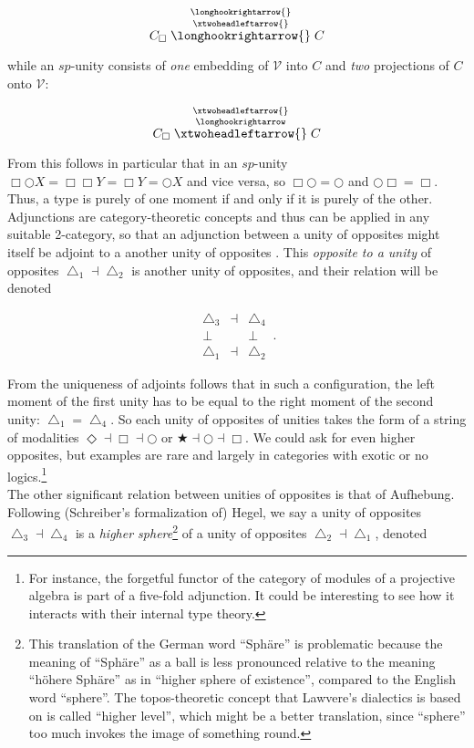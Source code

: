 \documentclass{article}
\begin{document}
$$C_\Box\stackrel{\longhookrightarrow{}}{\stackrel{\xtwoheadleftarrow{}}{\longhookrightarrow{}}}C$$

while an $sp$-unity consists of \emph{one} embedding of $\mathcal{V}$ into $C$ and \emph{two} projections
of $C$ onto $\mathcal{V}$:

$$C_\Box\stackrel{\xtwoheadleftarrow{}}{\stackrel{\longhookrightarrow}{\xtwoheadleftarrow{}}}C$$

From this follows in particular that in an $sp$-unity $\Box\bigcirc X=\Box\Box Y=\Box Y= \bigcirc X$ and
vice versa, so $\Box\bigcirc=\bigcirc$ and $\bigcirc\Box=\Box$. Thus, a type is purely of one moment if
and only if it is purely of the other. \\

Adjunctions are category-theoretic concepts and thus can be applied in any suitable 2-category, so that
an adjunction between a unity of opposites might itself be adjoint to a another unity of opposites \cite{Shu}.
This \emph{opposite to a unity} of opposites $\bigtriangleup_1\dashv\bigtriangleup_2$ is another unity of
opposites, and their relation will be denoted 


$$
  \begin{array}{ccc}
    \bigtriangleup_3 &\dashv& \bigtriangleup_4
    \\
    \bot & & \bot
    \\
    \bigtriangleup_1 &\dashv& \bigtriangleup_2
    \end{array}
  \,.
$$

From the uniqueness of adjoints follows that in such a configuration, the left moment of the first unity
has to be equal to the right moment of the second unity: $\bigtriangleup_1=\bigtriangleup_4$. So each
unity of opposites of unities takes the form of a string of modalities $\Diamond\dashv\Box\dashv\bigcirc$
or $\bigstar\dashv\bigcirc\dashv\Box$. We could ask for even higher opposites, but examples are rare and
largely in categories with exotic or no logics.\footnote{For instance, the forgetful functor of the category
of modules of a projective algebra is part of a five-fold adjunction. It could be interesting to see how
it interacts with their internal type theory.} \\

The other significant relation between unities of opposites is that of Aufhebung. Following (Schreiber's
formalization of) Hegel, we say a unity of opposites $\bigtriangleup_3\dashv\bigtriangleup_4$ is a \emph{higher
sphere}\footnote{This translation of the German word ``Sphäre'' is problematic because the meaning of
``Sphäre'' as a ball is less pronounced relative to the meaning ``höhere Sphäre'' as in ``higher sphere
of existence'', compared to the English word ``sphere''. The topos-theoretic concept that Lawvere's dialectics
is based on is called ``higher level'', which might be a better translation, since ``sphere'' too much
invokes the image of something round.} of a unity of opposites $\bigtriangleup_2\dashv\bigtriangleup_1$,
denoted 
\end{document}
